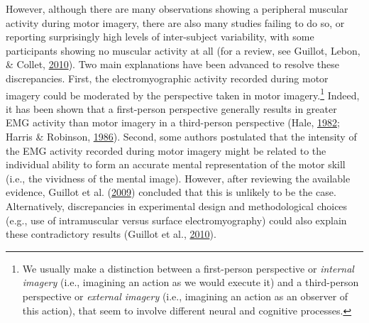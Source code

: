 \documentclass[a4paper,12pt,twoside,onecolumn,openright,final,oldfontcommands]{memoir}
\let\rmarkdownfootnote\footnote%
\def\footnote{\protect\rmarkdownfootnote}
\begin{document}
However, although there are many observations showing a peripheral muscular activity during motor imagery, there are also many studies failing to do so, or reporting surprisingly high levels of inter-subject variability, with some participants showing no muscular activity at all (for a review, see Guillot, Lebon, \& Collet, \protect\hyperlink{ref-guillot_electromyographic_2010}{2010}). Two main explanations have been advanced to resolve these discrepancies. First, the electromyographic activity recorded during motor imagery could be moderated by the perspective taken in motor imagery.\footnote{We usually make a distinction between a first-person perspective or \emph{internal imagery} (i.e., imagining an action as we would execute it) and a third-person perspective or \emph{external imagery} (i.e., imagining an action as an observer of this action), that seem to involve different neural and cognitive processes.} Indeed, it has been shown that a first-person perspective generally results in greater EMG activity than motor imagery in a third-person perspective (Hale, \protect\hyperlink{ref-hale_effects_1982}{1982}; Harris \& Robinson, \protect\hyperlink{ref-harris_effects_1986}{1986}). Second, some authors postulated that the intensity of the EMG activity recorded during motor imagery might be related to the individual ability to form an accurate mental representation of the motor skill (i.e., the vividness of the mental image). However, after reviewing the available evidence, Guillot et al. (\protect\hyperlink{ref-guillot_brain_2009}{2009}) concluded that this is unlikely to be the case. Alternatively, discrepancies in experimental design and methodological choices (e.g., use of intramuscular versus surface electromyography) could also explain these contradictory results (Guillot et al., \protect\hyperlink{ref-guillot_electromyographic_2010}{2010}).

\vspace{2mm}
\end{document}
